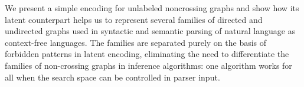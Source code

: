 We present a simple encoding for unlabeled noncrossing graphs and show how its latent counterpart helps us to represent several families of directed and undirected graphs used in syntactic and semantic parsing of natural language as context-free languages.  The families are separated purely on the basis of forbidden patterns in latent encoding, eliminating the need to differentiate the families of non-crossing graphs in inference algorithms: one algorithm works for all when the search space can be controlled in parser input.
